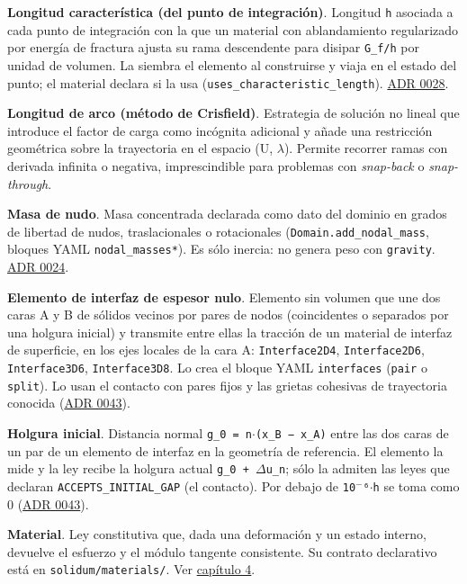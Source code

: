 \documentclass[11pt,oneside]{report}
\begin{document}
\textbf{Longitud característica (del punto de integración)}. Longitud \texttt{h} asociada a cada punto de integración con la que un material con ablandamiento regularizado por energía de fractura ajusta su rama descendente para disipar \texttt{G\_f/h} por unidad de volumen. La siembra el elemento al construirse y viaja en el estado del punto; el material declara si la usa (\texttt{uses\_\allowbreak{}characteristic\_\allowbreak{}length}). \hyperref[adr:0028]{ADR 0028}.

\textbf{Longitud de arco (método de Crisfield)}. Estrategia de solución no lineal que introduce el factor de carga como incógnita adicional y añade una restricción geométrica sobre la trayectoria en el espacio (U, \ensuremath{\lambda}). Permite recorrer ramas con derivada infinita o negativa, imprescindible para problemas con \textit{snap-back} o \textit{snap-through}.

\textbf{Masa de nudo}. Masa concentrada declarada como dato del dominio en grados de libertad de nudos, traslacionales o rotacionales (\texttt{Domain.\allowbreak{}add\_\allowbreak{}nodal\_\allowbreak{}mass}, bloques YAML \texttt{nodal\_masses*}). Es sólo inercia: no genera peso con \texttt{gravity}. \hyperref[adr:0024]{ADR 0024}.

\textbf{Elemento de interfaz de espesor nulo}. Elemento sin volumen que une dos caras A y B de sólidos vecinos por pares de nodos (coincidentes o separados por una holgura inicial) y transmite entre ellas la tracción de un material de interfaz de superficie, en los ejes locales de la cara A: \texttt{Interface2D4}, \texttt{Interface2D6}, \texttt{Interface3D6}, \texttt{Interface3D8}. Lo crea el bloque YAML \texttt{interfaces} (\texttt{pair} o \texttt{split}). Lo usan el contacto con pares fijos y las grietas cohesivas de trayectoria conocida (\hyperref[adr:0043]{ADR 0043}).

\textbf{Holgura inicial}. Distancia normal \texttt{g\_\allowbreak{}0 = n\ensuremath{\cdot}(x\_\allowbreak{}B − x\_\allowbreak{}A)} entre las dos caras de un par de un elemento de interfaz en la geometría de referencia. El elemento la mide y la ley recibe la holgura actual \texttt{g\_0 + \ensuremath{\Delta}u\_n}; sólo la admiten las leyes que declaran \texttt{ACCEPTS\_\allowbreak{}INITIAL\_\allowbreak{}GAP} (el contacto). Por debajo de \texttt{10\ensuremath{^{-}}⁶\ensuremath{\cdot}h} se toma como 0 (\hyperref[adr:0043]{ADR 0043}).

\textbf{Material}. Ley constitutiva que, dada una deformación y un estado interno, devuelve el esfuerzo y el módulo tangente consistente. Su contrato declarativo está en \texttt{solidum/\allowbreak{}materials/\allowbreak{}}. Ver \hyperref[cap:4]{capítulo 4}.
\end{document}
